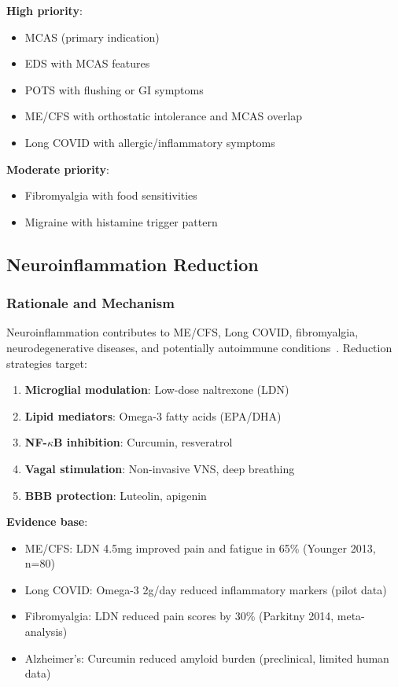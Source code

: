 \textbf{High priority}:
\begin{itemize}
    \item MCAS (primary indication)
    \item EDS with MCAS features
    \item POTS with flushing or GI symptoms
    \item ME/CFS with orthostatic intolerance and MCAS overlap
    \item Long COVID with allergic/inflammatory symptoms
\end{itemize}

\textbf{Moderate priority}:
\begin{itemize}
    \item Fibromyalgia with food sensitivities
    \item Migraine with histamine trigger pattern
\end{itemize}

\subsection{Neuroinflammation Reduction}
\label{sec:neuroinflammation-reduction}

\subsubsection{Rationale and Mechanism}

Neuroinflammation contributes to ME/CFS, Long COVID, fibromyalgia, neurodegenerative diseases, and potentially autoimmune conditions~\cite{Tate2022neuroinflammation}. Reduction strategies target:

\begin{enumerate}
    \item \textbf{Microglial modulation}: Low-dose naltrexone (LDN)
    \item \textbf{Lipid mediators}: Omega-3 fatty acids (EPA/DHA)
    \item \textbf{NF-$\kappa$B inhibition}: Curcumin, resveratrol
    \item \textbf{Vagal stimulation}: Non-invasive VNS, deep breathing
    \item \textbf{BBB protection}: Luteolin, apigenin
\end{enumerate}

\textbf{Evidence base}:
\begin{itemize}
    \item ME/CFS: LDN 4.5mg improved pain and fatigue in 65\% (Younger 2013, n=80)~\cite{Younger2013}
    \item Long COVID: Omega-3 2g/day reduced inflammatory markers (pilot data)
    \item Fibromyalgia: LDN reduced pain scores by 30\% (Parkitny 2014, meta-analysis)~\cite{Parkitny2014}
    \item Alzheimer's: Curcumin reduced amyloid burden (preclinical, limited human data)
\end{itemize}


